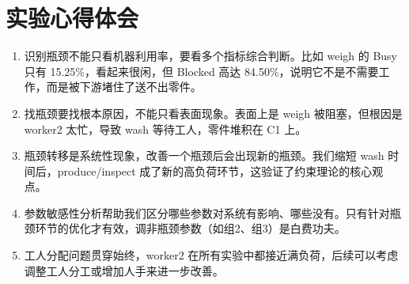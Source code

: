 \documentclass[12pt, a4paper, UTF8]{ctexart}
\begin{document}
\section{实验心得体会}
\begin{enumerate}
    \item 识别瓶颈不能只看机器利用率，要看多个指标综合判断。比如 weigh 的 Busy 只有 15.25\%，看起来很闲，但 Blocked 高达 84.50\%，说明它不是不需要工作，而是被下游堵住了送不出零件。
    \item 找瓶颈要找根本原因，不能只看表面现象。表面上是 weigh 被阻塞，但根因是 worker2 太忙，导致 wash 等待工人，零件堆积在 C1 上。
    \item 瓶颈转移是系统性现象，改善一个瓶颈后会出现新的瓶颈。我们缩短 wash 时间后，produce/inspect 成了新的高负荷环节，这验证了约束理论的核心观点。
    \item 参数敏感性分析帮助我们区分哪些参数对系统有影响、哪些没有。只有针对瓶颈环节的优化才有效，调非瓶颈参数（如组2、组3）是白费功夫。
    \item 工人分配问题贯穿始终，worker2 在所有实验中都接近满负荷，后续可以考虑调整工人分工或增加人手来进一步改善。
\end{enumerate}
\end{document}
